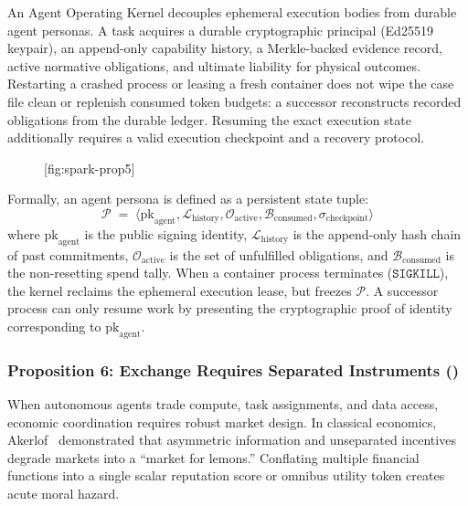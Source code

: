 An Agent Operating Kernel decouples ephemeral execution bodies from durable agent personas. A task acquires a durable cryptographic principal (Ed25519 keypair), an append-only capability history, a Merkle-backed evidence record, active normative obligations, and ultimate liability for physical outcomes. Restarting a crashed process or leasing a fresh container does not wipe the case file clean or replenish consumed token budgets: a successor reconstructs recorded obligations from the durable ledger. Resuming the exact execution state additionally requires a valid execution checkpoint and a recovery protocol.

\begin{figure}[tp]
  \centering
  [fig:spark-prop5]
\end{figure}

Formally, an agent persona is defined as a persistent state tuple:
\begin{equation}
\mathcal{P} \;=\; \langle \mathrm{pk}_{\text{agent}}, \mathcal{L}_{\text{history}}, \mathcal{O}_{\text{active}}, \mathcal{B}_{\text{consumed}}, \sigma_{\text{checkpoint}} \rangle
\end{equation}
where $\mathrm{pk}_{\text{agent}}$ is the public signing identity, $\mathcal{L}_{\text{history}}$ is the append-only hash chain of past commitments, $\mathcal{O}_{\text{active}}$ is the set of unfulfilled obligations, and $\mathcal{B}_{\text{consumed}}$ is the non-resetting spend tally. When a container process terminates ($\mathtt{SIGKILL}$), the kernel reclaims the ephemeral execution lease, but freezes $\mathcal{P}$. A successor process can only resume work by presenting the cryptographic proof of identity corresponding to $\mathrm{pk}_{\text{agent}}$.

\subsubsection*{Proposition 6: Exchange Requires Separated Instruments ()}
When autonomous agents trade compute, task assignments, and data access, economic coordination requires robust market design. In classical economics, Akerlof~ demonstrated that asymmetric information and unseparated incentives degrade markets into a ``market for lemons.'' Conflating multiple financial functions into a single scalar reputation score or omnibus utility token creates acute moral hazard.

